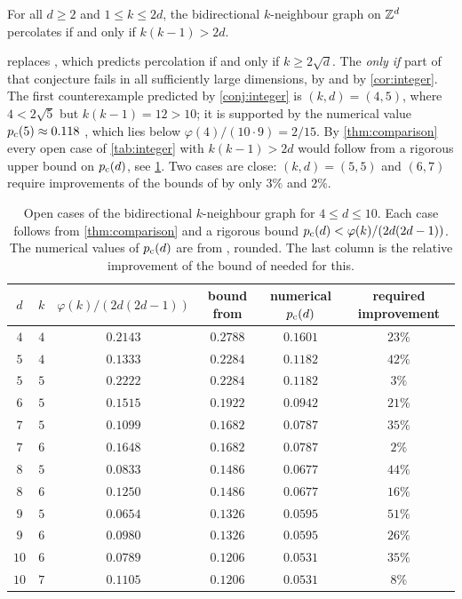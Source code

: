 \documentclass[11pt,letterpaper]{article}
\begin{document}
\begin{conjecture}\label{conj:integer}
For all $d\ge2$ and $1\le k\le2d$, the bidirectional $k$-neighbour graph on $\mathbb Z^d$ percolates if and only if $k(k-1)>2d$.
\end{conjecture}

\begin{remark}\label{rem:integer}
 replaces \cite[Conjecture~3.3]{JKLT25}, which predicts percolation if and only if $k\ge2\sqrt d$. The \emph{only if} part of that conjecture fails in all sufficiently large dimensions, by \cite[Corollary~3.11]{BJKLRT25} and by \cref{cor:integer}. The first counterexample predicted by \cref{conj:integer} is $(k,d)=(4,5)$, where $4<2\sqrt5$ but $k(k-1)=12>10$; it is supported by the numerical value $p_{\mathrm c}(5)\approx0.118$ \cite{MM18}, which lies below $\varphi(4)/(10\cdot9)=2/15$. By \cref{thm:comparison} every open case of \cref{tab:integer} with $k(k-1)>2d$ would follow from a rigorous upper bound on $p_{\mathrm c}(d)$, see \cref{tab:open}. Two cases are close: $(k,d)=(5,5)$ and $(6,7)$ require improvements of the bounds of \cite{GPS26} by only $3\%$ and $2\%$.
\end{remark}

\begin{table}[ht]
\centering
\begin{tabular}{cccccc}
\toprule
$d$ & $k$ & $\varphi(k)/(2d(2d-1))$ & bound from \cite{GPS26} & numerical $p_{\mathrm c}(d)$ & required improvement\\
\midrule
$4$ & $4$ & $0.2143$ & $0.2788$ & $0.1601$ & $23\%$\\
$5$ & $4$ & $0.1333$ & $0.2284$ & $0.1182$ & $42\%$\\
$5$ & $5$ & $0.2222$ & $0.2284$ & $0.1182$ & $3\%$\\
$6$ & $5$ & $0.1515$ & $0.1922$ & $0.0942$ & $21\%$\\
$7$ & $5$ & $0.1099$ & $0.1682$ & $0.0787$ & $35\%$\\
$7$ & $6$ & $0.1648$ & $0.1682$ & $0.0787$ & $2\%$\\
$8$ & $5$ & $0.0833$ & $0.1486$ & $0.0677$ & $44\%$\\
$8$ & $6$ & $0.1250$ & $0.1486$ & $0.0677$ & $16\%$\\
$9$ & $5$ & $0.0654$ & $0.1326$ & $0.0595$ & $51\%$\\
$9$ & $6$ & $0.0980$ & $0.1326$ & $0.0595$ & $26\%$\\
$10$ & $6$ & $0.0789$ & $0.1206$ & $0.0531$ & $35\%$\\
$10$ & $7$ & $0.1105$ & $0.1206$ & $0.0531$ & $8\%$\\
\bottomrule
\end{tabular}
\caption{Open cases of the bidirectional $k$-neighbour graph for $4\le d\le10$. Each case follows from \cref{thm:comparison} and a rigorous bound $p_{\mathrm c}(d)<\varphi(k)/(2d(2d-1))$. The numerical values of $p_{\mathrm c}(d)$ are from \cite{MM18}, rounded. The last column is the relative improvement of the bound of \cite{GPS26} needed for this.
}\label{tab:open}
\end{table}
\end{document}
